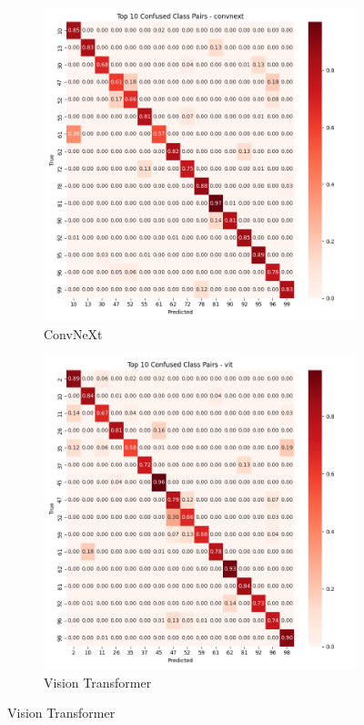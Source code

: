 \documentclass[11pt]{article}
\begin{document}
\begin{figure}[htbp]
\centering
\captionsetup[subfigure]{labelformat=empty}

\begin{subfigure}[b]{0.48\textwidth}
\includegraphics[width=\textwidth]{confusion_matrix_convnext_top_confused.png}
\caption{ConvNeXt}
\end{subfigure}
\hfill
\begin{subfigure}[b]{0.48\textwidth}
\includegraphics[width=\textwidth]{confusion_matrix_vit_top_confused.png}
\caption{Vision Transformer}
\end{subfigure}


\end{figure}
\end{document}
